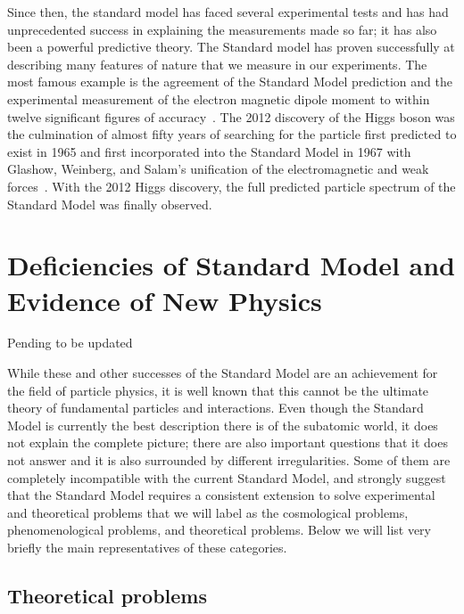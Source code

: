 Since then, the standard model has faced several experimental tests and has had unprecedented success in explaining the measurements made so far; it has also been a powerful predictive theory. The Standard model has proven  successfully at describing many features of nature that we measure in our experiments. The most famous example is the agreement of the Standard Model prediction and the experimental measurement of the electron magnetic dipole moment to within twelve  significant figures of accuracy~\parencite{PhysRevLett.97.030801}.  The 2012 discovery of the Higgs boson was the culmination of almost fifty years of searching for the particle first predicted to exist in 1965 and first incorporated into the Standard Model in 1967 with Glashow, Weinberg, and Salam's unification of the electromagnetic and weak forces~\parencite{PhysRevLett.19.1264, gl1961579}. With the 2012 Higgs discovery, the full predicted particle spectrum of the Standard Model was finally observed.


\section{Deficiencies of Standard Model and Evidence of New Physics}

{\Large Pending to be updated} %

While these and other successes of the Standard Model are an achievement for the field of particle physics, it is well known that this cannot be the ultimate theory of fundamental particles and interactions. Even though the Standard Model is currently the best description there is of the subatomic world, it does not explain the complete picture; there are also important questions that it does not answer and it is also surrounded by different irregularities. Some of them are completely incompatible with the current Standard Model, and strongly suggest that the Standard Model requires a consistent extension to solve experimental and theoretical problems that we will label as the cosmological problems, phenomenological problems, and theoretical problems. Below we will list very briefly the main representatives of these categories.



\subsection{Theoretical problems}


